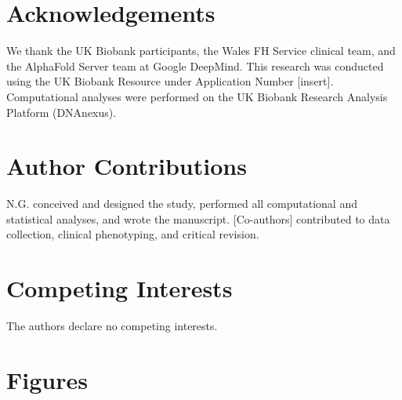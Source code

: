 \documentclass[11pt,a4paper]{article}
\begin{document}
\section*{Acknowledgements}

We thank the UK Biobank participants, the Wales FH Service clinical team, and the AlphaFold Server team at Google DeepMind. This research was conducted using the UK Biobank Resource under Application Number [insert]. Computational analyses were performed on the UK Biobank Research Analysis Platform (DNAnexus).

\section*{Author Contributions}

N.G. conceived and designed the study, performed all computational and statistical analyses, and wrote the manuscript. [Co-authors] contributed to data collection, clinical phenotyping, and critical revision.

\section*{Competing Interests}

The authors declare no competing interests.

\clearpage
\section*{Figures}
\end{document}
